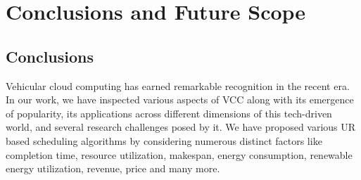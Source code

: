 \setcounter{equation}{0}
\chapter{Conclusions and Future Scope}
\section{Conclusions}
Vehicular cloud computing has earned remarkable recognition in the recent era. In our work, we have inspected various aspects of VCC along with its emergence of popularity, its applications across different dimensions of this tech-driven world, and several research challenges posed by it. We have proposed various UR based scheduling algorithms by considering numerous distinct factors like completion time, resource utilization, makespan, energy consumption, renewable energy utilization, revenue, price and many more. 






